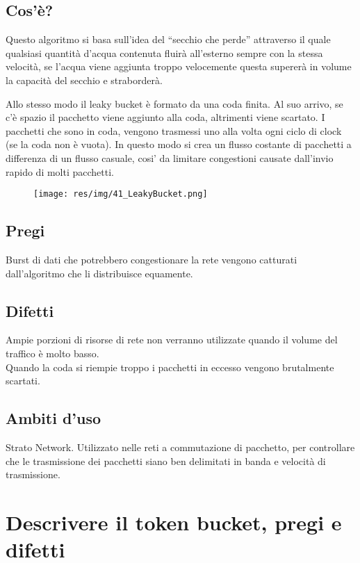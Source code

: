 \subsection{Cos'è?}
Questo algoritmo si basa sull'idea del “secchio che perde” attraverso il quale qualsiasi quantità d'acqua contenuta fluirà all'esterno sempre con la stessa velocità, se l'acqua viene aggiunta troppo velocemente questa supererà in volume la capacità del secchio e straborderà.

Allo stesso modo il leaky bucket è formato da una coda finita. Al suo arrivo, se c'è spazio il pacchetto viene aggiunto alla coda, altrimenti viene scartato. I pacchetti che sono in coda, vengono trasmessi uno alla volta ogni ciclo di clock (se la coda non è vuota). In questo modo si crea un flusso costante di pacchetti a differenza di un flusso casuale, cosi' da limitare congestioni causate dall'invio rapido di molti pacchetti.

\begin{figure}[H]
\centering
\texttt{[image: res/img/41\_LeakyBucket.png]}
\end{figure}

\subsection{Pregi}
Burst di dati che potrebbero congestionare la rete vengono catturati dall'algoritmo che li distribuisce equamente.

\subsection{Difetti}
Ampie porzioni di risorse di rete non verranno utilizzate quando il volume del traffico è molto basso.\\
Quando la coda si riempie troppo i pacchetti in eccesso vengono brutalmente scartati.

\subsection{Ambiti d'uso}
Strato Network. Utilizzato nelle reti a commutazione di pacchetto, per controllare che le trasmissione dei pacchetti siano ben delimitati in banda e velocità di trasmissione.

\section{Descrivere il token bucket, pregi e difetti}

